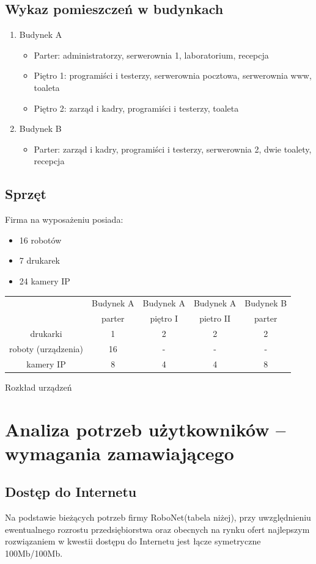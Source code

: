 \documentclass{article}
\begin{document}
\subsection{Wykaz pomieszczeń w budynkach}
\begin{enumerate}
	\item Budynek A
	\begin{itemize}
		\item Parter: administratorzy, serwerownia 1, laboratorium, recepcja
		\item Piętro 1: programiści i testerzy, serwerownia pocztowa, serwerownia www, toaleta
		\item Piętro 2: zarząd i kadry, programiści i testerzy, toaleta
	\end{itemize}
	\item Budynek B
		\begin{itemize}
		\item Parter: zarząd i kadry, programiści i testerzy, serwerownia 2, dwie toalety, recepcja
	\end{itemize}
\end{enumerate}
\subsection{Sprzęt}
Firma na wyposażeniu posiada:
\begin{itemize}
	\item 16 robotów
	\item 7 drukarek
	\item 24 kamery IP
\end{itemize}
\begin{Tabela}[!ht]
	\centering
\begin{tabular}{|c|c|c|c|c|}\hline
	\centering
	& Budynek A & Budynek A & Budynek A & 	Budynek B 	\\
	\centering
 & parter & piętro I & pietro II & parter \\
 \hline
drukarki & 1 & 2 & 2 & 2\\
\hline
roboty (urządzenia) & 16 & - & - & - \\
\hline
kamery IP & 8 & 4 & 4 & 8 \\
\hline
\end{tabular}
\caption{Rozkład urządzeń}
\end{Tabela}
\newpage
\section{Analiza potrzeb użytkowników – wymagania zamawiającego}
\subsection{Dostęp do Internetu}
Na podstawie bieżących potrzeb firmy RoboNet(tabela niżej), przy uwzględnieniu ewentualnego rozrostu przedsiębiorstwa oraz obecnych na rynku ofert najlepszym rozwiązaniem w kwestii dostępu do Internetu jest łącze symetryczne 100Mb/100Mb.\newline
\end{document}
